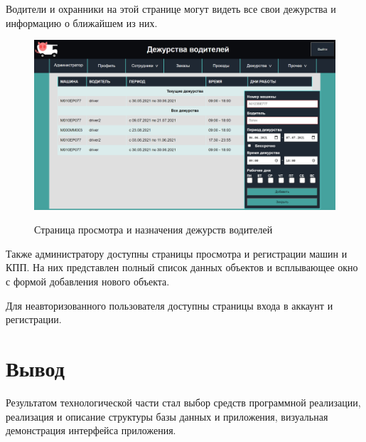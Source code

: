 Водители и охранники на этой странице могут видеть все свои дежурства и информацию о ближайшем из них.
\begin{figure}[h!] 
	\begin{center}
		{\includegraphics[scale=0.43, angle=0]{sc/driver_duty}}
		\caption{Страница просмотра и назначения дежурств водителей}
		\label{sc:driver_duty}
	\end{center}
\end{figure}

Также администратору доступны страницы просмотра и регистрации машин и КПП. На них представлен полный список данных объектов и всплывающее окно с формой добавления нового объекта.

Для неавторизованного пользователя доступны страницы входа в аккаунт и регистрации.

\section*{Вывод}
Результатом технологической части стал выбор средств программной реализации, реализация и описание структуры базы данных и приложения, визуальная демонстрация интерфейса приложения.
